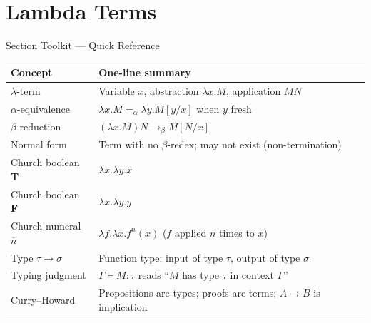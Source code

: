 \section{Lambda Terms}

\begin{toolkitbox}{Section Toolkit --- Quick Reference}
\small
\begin{tabular}{l l}
\toprule
\textbf{Concept} & \textbf{One-line summary} \\
\midrule
$\lambda$-term
  & Variable $x$, abstraction $\lambda x.M$, application $MN$ \\
$\alpha$-equivalence
  & $\lambda x.M =_\alpha \lambda y.M[y/x]$ when $y$ fresh \\
$\beta$-reduction
  & $(\lambda x.M)N \to_\beta M[N/x]$ \\
Normal form
  & Term with no $\beta$-redex; may not exist (non-termination) \\
Church boolean \textbf{T}
  & $\lambda x.\lambda y.x$ \\
Church boolean \textbf{F}
  & $\lambda x.\lambda y.y$ \\
Church numeral $\overline{n}$
  & $\lambda f.\lambda x.f^n(x)$ ($f$ applied $n$ times to $x$) \\
Type $\tau \to \sigma$
  & Function type: input of type $\tau$, output of type $\sigma$ \\
Typing judgment
  & $\Gamma\vdash M : \tau$ reads ``$M$ has type $\tau$ in context $\Gamma$'' \\
Curry--Howard
  & Propositions are types; proofs are terms; $A\to B$ is implication \\
\bottomrule
\end{tabular}
\end{toolkitbox}



